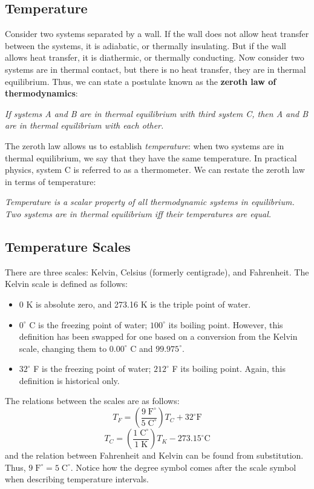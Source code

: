 \documentclass[../PhysicsFormulae.tex]{subfiles}
\begin{document}
\subsection{Temperature}
Consider two systems separated by a wall. If the wall does not allow heat transfer between the systems, it is adiabatic, or thermally insulating. But if the wall allows heat transfer, it is diathermic, or thermally conducting. Now consider two systems are in thermal contact, but there is no heat transfer, they are in thermal equilibrium. Thus, we can state a postulate known as the \textbf{zeroth law of thermodynamics}: \bigskip

\textit{If systems A and B are in thermal equilibrium with third system C, then A and B are in thermal equilibrium with each other.} \bigskip

The zeroth law allows us to establish \textit{temperature}: when two systems are in thermal equilibrium, we say that they have the same temperature. In practical physics, system C is referred to as a thermometer. We can restate the zeroth law in terms of temperature: \bigskip

\textit{Temperature is a scalar property of all thermodynamic systems in equilibrium. Two systems are in thermal equilibrium iff their temperatures are equal.}
\subsection{Temperature Scales}
There are three scales: Kelvin, Celsius (formerly centigrade), and Fahrenheit. The Kelvin scale is defined as follows: 
\begin{itemize}
\item 0 K is absolute zero, and 273.16 K is the triple point of water. 
\item $0^{\circ}$ C is the freezing point of water; $100^{\circ}$ its boiling point. However, this definition has been swapped for one based on a conversion from the Kelvin scale, changing them to $0.00^{\circ}$ C and $99.975^{\circ}$. 
\item $32^{\circ}$ F is the freezing point of water; $212^{\circ}$ F its boiling point. Again, this definition is historical only. 
\end{itemize}
The relations between the scales are as follows: 
\[ T_F = \left(\frac{9 \; \textrm{F}^{\circ}}{5 \; \textrm{C}^{\circ}}\right) T_C + 32^{\circ} \textrm{F} \]
\[ T_C = \left(\frac{1 \; \textrm{C}^{\circ}}{1 \; \textrm{K}}\right) T_K - 273.15^{\circ} \textrm{C} \]
and the relation between Fahrenheit and Kelvin can be found from substitution. Thus, $9 \; \textrm{F}^{\circ} = 5 \; \textrm{C}^{\circ}$. Notice how the degree symbol comes after the scale symbol when describing temperature intervals.
\end{document}
